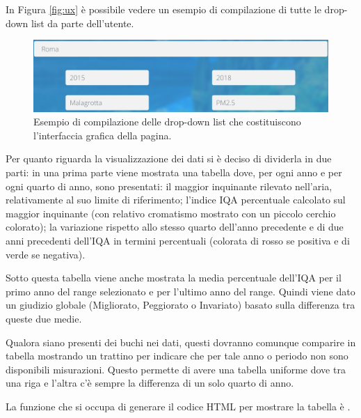 In Figura \vref{fig:ux} è possibile vedere un esempio di compilazione di tutte
le drop-down list da parte dell'utente.

\begin{figure}[htb]
	\centering
	\includegraphics[width=\textwidth]{img/ux}
	\caption{Esempio di compilazione delle drop-down list che costituiscono
	l'interfaccia grafica della pagina.}\label{fig:ux}
\end{figure}

Per quanto riguarda la visualizzazione dei dati si è deciso di dividerla in due
parti: in una prima parte viene mostrata una tabella dove, per ogni anno e per
ogni quarto di anno, sono presentati: il maggior inquinante rilevato nell'aria,
relativamente al suo limite di riferimento; l'indice IQA percentuale calcolato
sul maggior inquinante (con relativo cromatismo mostrato con un piccolo cerchio
colorato); la variazione rispetto allo stesso quarto dell'anno precedente e di
due anni precedenti dell'IQA in termini percentuali (colorata di rosso se
positiva e di verde se negativa).

Sotto questa tabella viene anche mostrata la media percentuale dell'IQA per il
primo anno del range selezionato  e per
l'ultimo anno del range. Quindi viene dato un giudizio globale (Migliorato,
Peggiorato o Invariato) basato sulla differenza tra queste due medie.

Qualora siano presenti dei buchi nei dati, questi dovranno comunque comparire in
tabella mostrando un trattino per indicare che per tale anno o periodo non sono
disponibili misurazioni. Questo permette di avere una tabella uniforme dove tra
una riga e l'altra c'è sempre la differenza di un solo quarto di anno.

La funzione che si occupa di generare il codice HTML per mostrare la tabella è
.

